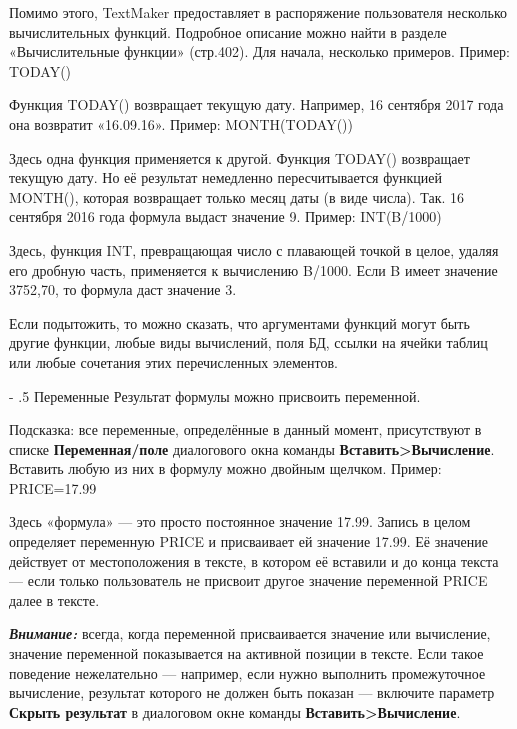 ﻿\documentclass[a4paper,10pt]{article}
\makeatletter
\renewcommand\paragraph{%
   \@startsection{paragraph}{4}{0mm}%
      {-\baselineskip}%
      {.5\baselineskip}%
      {\normalfont\normalsize\bfseries}}
\makeatother
\begin{document}
Помимо этого, TextMaker предоставляет в распоряжение пользователя несколько вычислительных функций. Подробное описание можно найти в разделе «Вычислительные функции» (стр.402). Для начала, несколько примеров.
\newline
\newline
Пример: TODAY()

Функция TODAY() возвращает текущую дату. Например, 16 сентября 2017 года она возвратит «16.09.16».
\newline
\newline
Пример: MONTH(TODAY())

Здесь одна функция применяется к другой. Функция TODAY() возвращает текущую дату. Но её результат немедленно пересчитывается функцией MONTH(), которая возвращает только месяц даты (в виде числа). Так. 16 сентября 2016 года формула выдаст значение 9.
\newline
\newline
Пример: INT(B/1000)

Здесь, функция INT, превращающая число с плавающей точкой в целое, удаляя его дробную часть, применяется к вычислению B/1000. Если B имеет значение 3752,70, то формула даст значение 3.

Если подытожить, то можно сказать, что аргументами функций могут быть другие функции, любые виды вычислений, поля БД, ссылки на ячейки таблиц или любые сочетания этих перечисленных элементов.

\paragraph{Переменные}
Результат формулы можно присвоить переменной.

Подсказка: все переменные, определённые в данный момент, присутствуют в списке \textbf{Переменная/поле} диалогового окна команды \textbf{Вставить>Вычисление}. Вставить любую из них в формулу можно двойным щелчком.
\newline
\newline
Пример: PRICE=17.99

Здесь «формула» — это просто постоянное значение 17.99. Запись в целом определяет переменную PRICE и присваивает ей значение 17.99. Её значение действует от местоположения в тексте, в котором её вставили и до конца текста — если только пользователь не присвоит другое значение переменной PRICE далее в тексте.

\pagebreak

\begin{mdframed}[backgroundcolor=blue!10]
\textbf{\textit{Внимание:}} всегда, когда переменной присваивается значение или вычисление, значение переменной показывается на активной позиции в тексте. Если такое поведение нежелательно — например, если нужно выполнить промежуточное вычисление, результат которого не должен быть показан — включите параметр \textbf{Скрыть результат} в диалоговом окне команды \textbf{Вставить>Вычисление}.
\end{mdframed}
\end{document}
